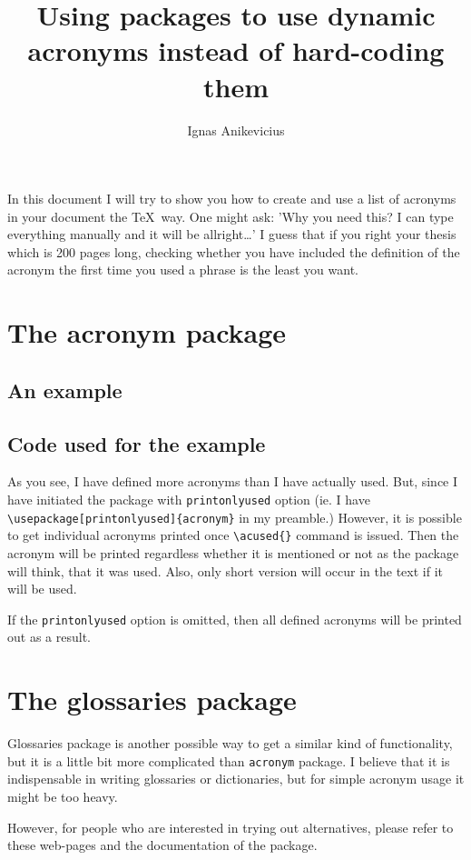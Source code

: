 \documentclass[a4paper,11pt]{article}
\title{Using packages to use dynamic acronyms instead of hard-coding them}
\author{Ignas Anikevicius}
\begin{document}
\maketitle

In this document I will try to show you how to create and use a list of acronyms
in your document the \TeX\ way. One might ask: 'Why you need this? I can type
everything manually and it will be allright\ldots' I guess that if you right
your thesis which is 200 pages long, checking whether you have included the
definition of the acronym the first time you used a phrase is the least you
want.

\section{The acronym package}

\subsection{An example}



\subsection{Code used for the example}



As you see, I have defined more acronyms than I have actually used. But, since I
have initiated the package with \verb|printonlyused| option (ie. I have
\verb|\usepackage[printonlyused]{acronym}| in my preamble.) However, it is
possible to get individual acronyms printed once \verb|\acused{}| command is
issued. Then the acronym will be printed regardless whether it is mentioned or
not as the package will think, that it was used. Also, only short version will
occur in the text if it will be used.

If the \verb|printonlyused| option is omitted, then all defined acronyms will be
printed out as a result.

\section{The glossaries package}

Glossaries package is another possible way to get a similar kind of
functionality, but it is a little bit more complicated than \verb|acronym|
package. I believe that it is indispensable in writing glossaries or
dictionaries, but for simple acronym usage it might be too heavy.

However, for people who are interested in trying out alternatives, please refer
to these web-pages and the documentation of the package.
\end{document}
